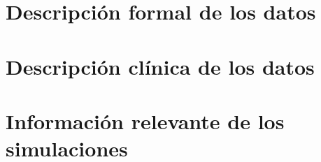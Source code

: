 
\section{Descripción formal de los datos}

\section{Descripción clínica de los datos}

\section{Información relevante de los simulaciones}

